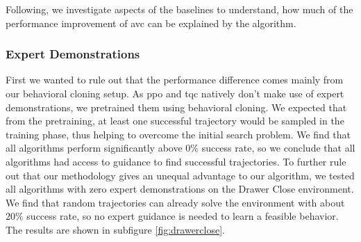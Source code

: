 Following, we investigate aspects of the baselines to understand, how much of the performance improvement of \ac{avc} can be explained by the algorithm. 

\subsubsection{Expert Demonstrations}
First we wanted to rule out that the performance difference comes mainly from our behavioral cloning setup. As \ac{ppo} and \ac{tqc} natively don't make use of expert demonstrations,
we pretrained them using behavioral cloning. We expected that from the pretraining, at least one successful trajectory would be sampled in the training phase, thus
helping to overcome the initial search problem. We find that all algorithms perform significantly above $0\%$ success rate, so we conclude that all algorithms had
access to guidance to find successful trajectories. To further rule out that our methodology gives an unequal advantage to our algorithm, we tested all algorithms with 
zero expert demonstrations on the 
Drawer Close environment. We find that random trajectories can already solve the environment with about $20\%$ success rate, so no expert guidance is needed to learn a feasible behavior.
The results are shown in subfigure \ref{fig:drawerclose}.\\ 

